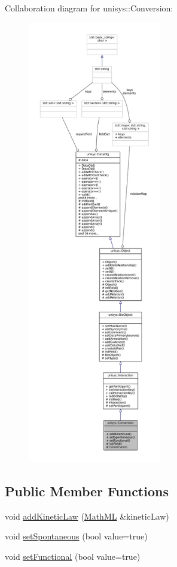 Collaboration diagram for unisys\-:\-:Conversion\-:
\nopagebreak
\begin{figure}[H]
\begin{center}
\leavevmode
\includegraphics[height=550pt]{classunisys_1_1Conversion__coll__graph}
\end{center}
\end{figure}
\subsection*{Public Member Functions}
\begin{DoxyCompactItemize}
\item 
void \hyperlink{classunisys_1_1Conversion_afca30f92317873b364fe2a25e194dc04}{add\-Kinetic\-Law} (\hyperlink{classunisys_1_1MathML}{Math\-M\-L} \&kinetic\-Law)
\item 
void \hyperlink{classunisys_1_1Conversion_a7deb28962c5f6ba35dab941585bce610}{set\-Spontaneous} (bool value=true)
\item 
void \hyperlink{classunisys_1_1Conversion_ad845f9c8f2e968f346fc67507f48d565}{set\-Functional} (bool value=true)
\end{DoxyCompactItemize}
